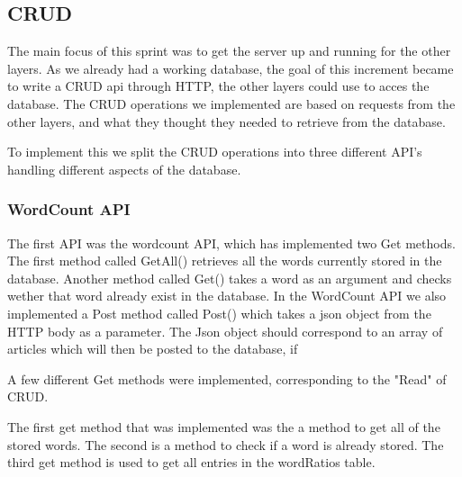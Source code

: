 \subsection{CRUD}

The main focus of this sprint was to get the server up and running for the other layers. 
As we already had a working database, the goal of this increment became to write a CRUD api through HTTP, 
the other layers could use to acces the database.
The CRUD operations we implemented are based on requests from the other layers, and what they thought they needed to retrieve from the database.

To implement this we split the CRUD operations into three different API's handling different aspects of the database.


\subsubsection{WordCount API}
The first API was the wordcount API, which has implemented two Get methods.
The first method called GetAll() retrieves all the words currently stored in the database.
Another method called Get() takes a word as an argument and checks wether that word already exist in the database.
In the WordCount API we also implemented a Post method called Post() which takes a json object from the HTTP body as a parameter. 
The Json object should correspond to an array of articles which will then be posted to the database, if 

A few different Get methods were implemented, corresponding to the "Read" of CRUD.

The first get method that was implemented was the a method to get all of the stored words.
The second is a method to check if a word is already stored.
The third  get method is used to get all entries in the wordRatios table.


